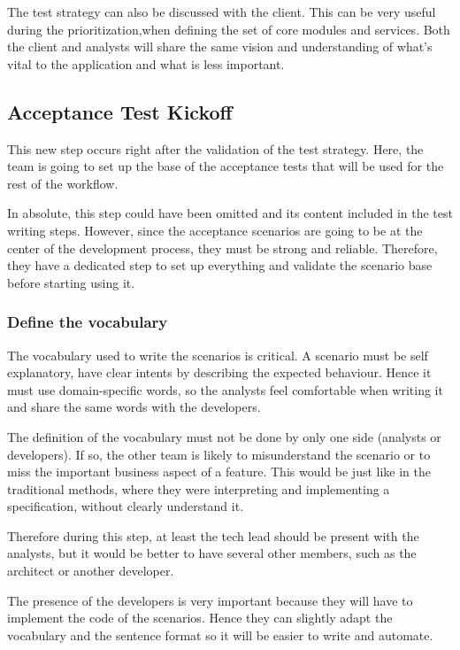 The test strategy can also be discussed with the client.
This can be very useful during the prioritization,when defining the set of
core modules and services.
Both the client and analysts will share the same vision and understanding of
what's vital to the application and what is less important.

\subsection{Acceptance Test Kickoff}\label{subsec:acceptance-test-kickoff}
This new step occurs right after the validation of the test strategy.
Here, the team is going to set up the base of the acceptance tests that will
be used for the rest of the workflow.

In absolute, this step could have been omitted and its content included in
the test writing steps.
However, since the acceptance scenarios are going to be at the center of the
development process, they must be strong and reliable.
Therefore, they have a dedicated step to set up everything and validate the
scenario base before starting using it.

\subsubsection{Define the vocabulary}
The vocabulary used to write the scenarios is critical.
A scenario must be self explanatory, have clear intents by describing the
expected behaviour.
Hence it must use domain-specific words, so the analysts feel comfortable
when writing it and share the same words with the developers.

The definition of the vocabulary must not be done by only one side (analysts
or developers).
If so, the other team is likely to misunderstand the scenario or to miss the
important business aspect of a feature.
This would be just like in the traditional methods, where they were
interpreting and implementing a specification, without clearly understand it.

Therefore during this step, at least the tech lead should be present with the
analysts, but it would be better to have several other members, such as the
architect or another developer.

The presence of the developers is very important because they will have to
implement the code of the scenarios.
Hence they can slightly adapt the vocabulary and the sentence format so it
will be easier to write and automate.

